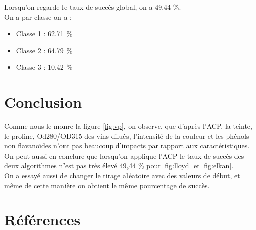 \documentclass[a4paper,12pt]{article}
\begin{document}
Lorsqu'on regarde le taux de succès global, on a 49.44 \%.\\

On a par classe on a :
\begin{itemize}
\item Classe 1 : 62.71 \%
\item Classe 2 : 64.79 \%
\item Classe 3 : 10.42 \%
\end{itemize}

\newpage

\section{Conclusion}
\label{sec:conclusion}

Comme nous le monre la figure \ref{fig:vp}, on observe, que d'après l'ACP,  la teinte, le proline, Od280/OD315 des vins dilués, l'intensité de la couleur et les phénols non flavanoïdes n'ont pas beaucoup d'impacts par rapport aux caractéristiques.\\

On peut aussi en conclure que lorsqu'on applique l'ACP le taux de succès des deux algorithmes n'est pas très élevé 49,44 \% pour \ref{fig:lloyd} et \ref{fig:elkan}.\\

On a essayé aussi de changer le tirage aléatoire avec des valeurs de début, et même de cette manière on obtient le même pourcentage de succès.

\section*{Références}
\label{sec:référence}
\end{document}
